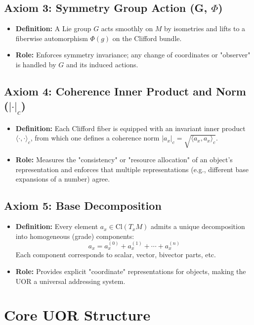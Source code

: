 \documentclass[12pt]{article}
\begin{document}
\subsection{Axiom 3: Symmetry Group Action (G, \(\Phi\))}
\begin{itemize}
    \item \textbf{Definition:} A Lie group \( G \) acts smoothly on \( M \) by isometries and lifts to a fiberwise automorphism \( \Phi(g) \) on the Clifford bundle.
    \item \textbf{Role:} Enforces symmetry invariance; any change of coordinates or "observer" is handled by \( G \) and its induced actions.
\end{itemize}

\subsection{Axiom 4: Coherence Inner Product and Norm (\(|\cdot|_c\))}
\begin{itemize}
    \item \textbf{Definition:} Each Clifford fiber is equipped with an invariant inner product \( \langle \cdot, \cdot \rangle_c \), from which one defines a coherence norm \( |a_x|_c = \sqrt{\langle a_x, a_x \rangle_c} \).
    \item \textbf{Role:} Measures the "consistency" or "resource allocation" of an object’s representation and enforces that multiple representations (e.g., different base expansions of a number) agree.
\end{itemize}

\subsection{Axiom 5: Base Decomposition}
\begin{itemize}
    \item \textbf{Definition:} Every element \( a_x \in \mathrm{Cl}(T_x M) \) admits a unique decomposition into homogeneous (grade) components:
    \[
    a_x = a_x^{(0)} + a_x^{(1)} + \cdots + a_x^{(n)}
    \]
    Each component corresponds to scalar, vector, bivector parts, etc.
    \item \textbf{Role:} Provides explicit "coordinate" representations for objects, making the UOR a universal addressing system.
\end{itemize}

\section{Core UOR Structure}
\end{document}
